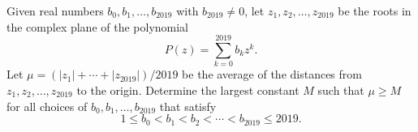 Given real numbers $b_0, b_1, \dots, b_{2019}$ with $b_{2019} \neq 0$, let $z_1,z_2,\dots,z_{2019}$ be 
the roots in the complex plane of the polynomial 
\[
P(z) = \sum_{k=0}^{2019} b_k z^k.
\]
Let $\mu = (|z_1| + \cdots + |z_{2019}|)/2019$ be the average of the distances from $z_1,z_2,\dots,z_{2019}$ to the origin. Determine the largest constant $M$ such that $\mu \geq M$ for all choices of $b_0,b_1,\dots, b_{2019}$ that satisfy
\[
1 \leq b_0 < b_1 < b_2 < \cdots < b_{2019} \leq 2019.
\]
